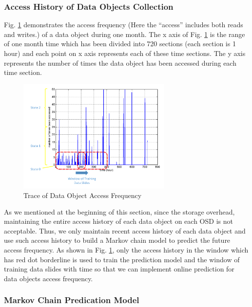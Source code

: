 \subsubsection{Access History of Data Objects Collection}

Fig. \ref{trace} demonstrates the access frequency (Here the ``access'' includes both reads and writes.) of a data object during one month.  The x axis of Fig. \ref{trace} is the range of one month time which has been divided into 720 sections (each section is 1 hour) and each point on x axis represents each of these time sections. The y axis represents the number of times the data object has been accessed during each time section.

\begin{figure}[!t]
\centering
\includegraphics[width=3.0in]{./trace.pdf}
\caption{Trace of Data Object Access Frequency}
\vspace{-0.25in}
\label{trace}
\end{figure}

As we mentioned at the beginning of this section, since the storage overhead, maintaining the entire access history of each data object on each OSD is not acceptable. Thus, we only maintain recent access history of each data object and use such access history to build a Markov chain model to predict the future access frequency. As shown in Fig. \ref{trace}, only the access history in the window which has red dot borderline is used to train the prediction model and the window of training data slides with time so that we can implement online prediction for data objects access frequency.

\subsubsection{Markov Chain Predication Model}


